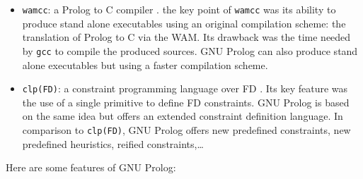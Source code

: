 \begin{itemize}

\item \texttt{wamcc}: a Prolog to C compiler \cite{wamcc}. the key point of \texttt{wamcc} was its
ability to produce stand alone executables using an original compilation
scheme: the translation of Prolog to C via the WAM. Its drawback was the time
needed by \texttt{gcc} to compile the produced sources. GNU Prolog can also
produce stand alone executables but using a faster compilation scheme.

\item \texttt{clp(FD)}: a constraint programming language over FD
\cite{long-clp-fd}. Its key feature was the use of a
single primitive to define FD constraints. GNU Prolog is based on the same
idea but offers an extended constraint definition language. In comparison to
\texttt{clp(FD)}, GNU Prolog offers new predefined constraints, new
predefined heuristics, reified constraints,\ldots

\end{itemize}

Here are some features of GNU Prolog:

